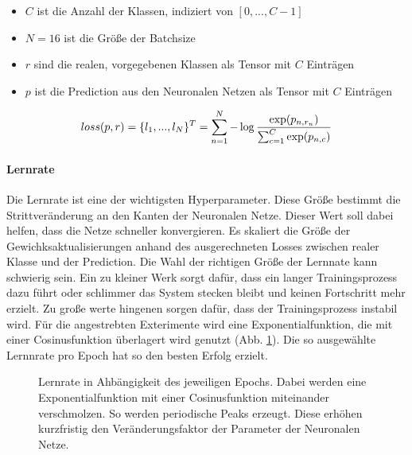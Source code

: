 \vspace{-0.2cm}

\begin{itemize}
  \setlength\itemsep{-0.5em}
\item $C$ ist die Anzahl der Klassen, indiziert von $[0, ..., C-1]$
\item $N = 16$ ist die Größe der Batchsize
\item $r$ sind die realen, vorgegebenen Klassen als Tensor mit $C$ Einträgen
\item $p$ ist die Prediction aus den Neuronalen Netzen als Tensor mit $C$ Einträgen
\end{itemize}

\vspace{-0.5cm}

\begin{equation}\centering
loss(p, r) = \{l_1, ... ,l_N\}^T = \sum_{n=1}^N {- \log \frac{\exp(p_{n,r_n})}{\sum_{c=1}^C \exp(p_{n,c})}}
\label{eq:loss}
\end{equation}


\paragraph{Lernrate} Die Lernrate ist eine der wichtigsten Hyperparameter. Diese Größe bestimmt die Strittveränderung an den Kanten der Neuronalen Netze. Dieser Wert soll dabei helfen, dass die Netze schneller konvergieren. Es skaliert die Größe der Gewichksaktualisierungen anhand des ausgerechneten Losses zwischen realer Klasse und der Prediction. Die Wahl der richtigen Größe der Lernnate kann schwierig sein. Ein zu kleiner Werk sorgt dafür, dass ein langer Trainingsprozess dazu führt oder schlimmer das System stecken bleibt und keinen Fortschritt mehr erzielt. Zu große werte hingenen sorgen dafür, dass der Trainingsprozess instabil wird. Für die angestrebten Exterimente wird eine Exponentialfunktion, die mit einer Cosinusfunktion überlagert wird genutzt (Abb. \ref{cap:lrrate}). Die so ausgewählte Lernnrate pro Epoch hat so den besten Erfolg erzielt.

\vspace{-0.8cm}

\begin{figure}[!h]\centering
\makebox[0pt]{}
\caption[Lernrate in ahbängigkeit des jeweiligen Epochs]{Lernrate in Ahbängigkeit des jeweiligen Epochs. Dabei werden eine Exponentialfunktion mit einer Cosinusfunktion miteinander verschmolzen. So werden periodische Peaks erzeugt. Diese erhöhen kurzfristig den Veränderungsfaktor der Parameter der Neuronalen Netze.}\label{cap:lrrate}
\end{figure}\label{fig:lrrate}













